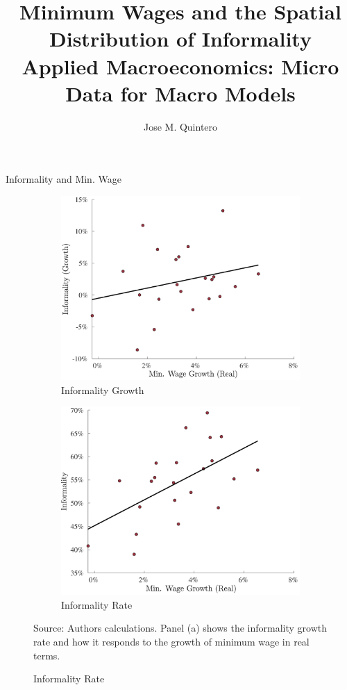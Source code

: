 \documentclass[usenames,dvipsnames,aspectratio=169]{beamer}
\title{Minimum Wages and the Spatial Distribution of Informality  \\ \small{Applied Macroeconomics: Micro Data for Macro Models} }
\author{Jose M. Quintero}
\begin{document}
\begin{frame}
  \titlepage
\end{frame}

\begin{frame}{Informality and Min. Wage}
    \begin{figure}
        \begin{center}
        \begin{subfigure}[b]{0.47\textwidth}
            \includegraphics[width=\textwidth]{Figures/infWage_g.pdf}
            \caption{Informality Growth}
        \end{subfigure}
        \begin{subfigure}[b]{0.47\textwidth}
            \includegraphics[width=\textwidth]{Figures/infWage_static.pdf}
            \caption{Informality Rate}
        \end{subfigure}
        \end{center}
        \vspace{5pt}
        \tiny{Source: Authors calculations. Panel (a) shows the informality growth rate and how it responds to the growth of minimum wage in real terms.}
    \end{figure}
    \hyperlink{hw1:institution}{}
\end{frame}
\end{document}
